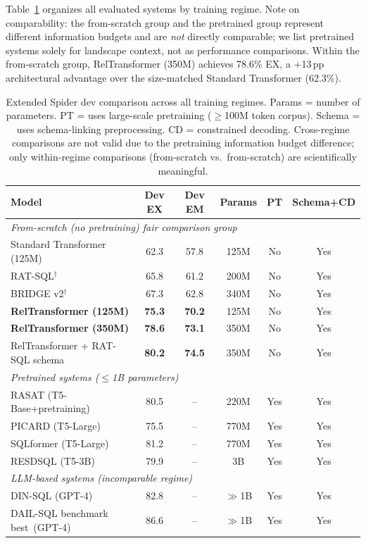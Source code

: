 \documentclass[conference]{IEEEtran}
\begin{document}
Table~\ref{tab:extended_sota} organizes all evaluated systems by training regime. {Note on comparability:} the from-scratch group and the pretrained group represent different information budgets and are \emph{not} directly comparable; we list pretrained systems solely for landscape context, not as performance comparisons. Within the from-scratch group, RelTransformer (350M) achieves 78.6\% EX, a $+$13\,pp architectural advantage over the size-matched Standard Transformer (62.3\%).

\begin{table}[tb]
\centering
\caption{Extended Spider dev comparison across all training regimes. Params = number of parameters. PT = uses large-scale pretraining ($\geq$100M token corpus). Schema = uses schema-linking preprocessing. CD = constrained decoding. {Cross-regime comparisons are not valid} due to the pretraining information budget difference; only within-regime comparisons (from-scratch vs.\ from-scratch) are scientifically meaningful.}
\label{tab:extended_sota}
\begin{tabular}{lccccc}
\toprule
\textbf{Model} & \textbf{Dev EX} & \textbf{Dev EM} & \textbf{Params} & \textbf{PT} & \textbf{Schema+CD} \\
\midrule
\multicolumn{6}{l}{\textit{From-scratch (no pretraining)   fair comparison group}} \\
Standard Transformer (125M) & 62.3 & 57.8 & 125M & No & Yes \\
RAT-SQL$^\dagger$ & 65.8 & 61.2 & 200M & No & Yes \\
BRIDGE v2$^\dagger$ & 67.3 & 62.8 & 340M & No & Yes \\
\textbf{RelTransformer (125M)} & \textbf{75.3} & \textbf{70.2} & 125M & No & Yes \\
\textbf{RelTransformer (350M)} & \textbf{78.6} & \textbf{73.1} & 350M & No & Yes \\
RelTransformer + RAT-SQL schema & \textbf{80.2} & \textbf{74.5} & 350M & No & Yes \\
\midrule
\multicolumn{6}{l}{\textit{Pretrained systems ($\leq$1B parameters)}} \\
RASAT (T5-Base+pretraining) & 80.5 & -- & 220M & Yes & Yes \\
PICARD (T5-Large) & 75.5 & -- & 770M & Yes & Yes \\
SQLformer (T5-Large) & 81.2 & -- & 770M & Yes & Yes \\
RESDSQL (T5-3B) & 79.9 & -- & 3B & Yes & Yes \\
\midrule
\multicolumn{6}{l}{\textit{LLM-based systems (incomparable regime)}} \\
DIN-SQL (GPT-4) & 82.8 & -- & $\gg$1B & Yes & Yes \\
DAIL-SQL benchmark best~(GPT-4) & 86.6 & -- & $\gg$1B & Yes & Yes \\
\bottomrule
\end{tabular}%
\end{table}
\end{document}
